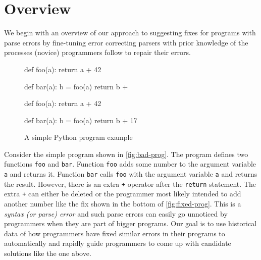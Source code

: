 \section{Overview}
\label{sec:overview}

We begin with an overview of our approach to suggesting fixes for programs with
parse errors by fine-tuning error correcting parsers with prior knowledge of the
processes (novice) programmers follow to repair their errors.

\begin{figure}[h]
\centering
\begin{minipage}[c]{0.48\linewidth}
\begin{ecode}
def foo(a):
  return a + 42

def bar(a):
  b = foo(a)
  return b +
\end{ecode}
\label{fig:bad-prog}
\end{minipage}%
\hspace{0.02\linewidth}%
\begin{minipage}[c]{0.48\linewidth}
\begin{ecode}
def foo(a):
  return a + 42

def bar(a):
  b = foo(a)
  return b + 17
\end{ecode}
\label{fig:fixed-prog}
\end{minipage}
\caption{A simple Python program example}
\label{fig:example-prog}
\end{figure}


 Consider the simple program shown in
\autoref{fig:bad-prog}. The program defines two functions \texttt{foo} and
\texttt{bar}. Function \texttt{foo} adds some number to the argument variable
\texttt{a} and returns it. Function \texttt{bar} calls \texttt{foo} with the
argument variable \texttt{a} and returns the result. However, there is an extra
\texttt{+} operator after the \texttt{return} statement. The extra \texttt{+}
can either be deleted or the programmer most likely intended to add another
number like the fix shown in the bottom of \autoref{fig:fixed-prog}. This is a
\emph{syntax (or parse) error} and such parse errors can easily go unnoticed
\citep{Denny_2012, Ahadi_2018, VanDerSpek_2005} by programmers when they are
part of bigger programs. Our goal is to use historical data of how programmers
have fixed similar errors in their programs to automatically and rapidly guide
programmers to come up with candidate solutions like the one above.


